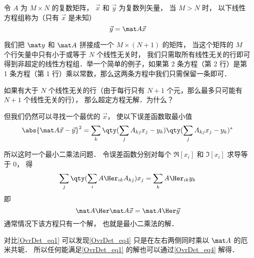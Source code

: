 
令 $A$ 为 $M\times N$ 的复数矩阵， $\vec x$ 和 $\vec y$ 为复数列矢量， 当 $M > N$ 时， 以下线性方程组称为（只有 $\vec x$ 是未知）
\begin{equation}\label{OvrDet_eq1}
\vec y = \mat A \vec x
\end{equation}

我们把 $\mat y$ 和 $\mat A$ 拼接成一个 $M\times(N+1)$ 的矩阵， 当这个矩阵的 $M$ 个行矢量中只有小于或等于 $N$ 个线性无关时， 我们只需取所有线性无关的行即可得到非超定的线性方程组．举一个简单的例子，如果第 2 条方程（第 2 行）是第 1 条方程（第 1 行）乘以常数，那么这两条方程中我们只需保留一条即可．

如果有大于 $N$ 个线性无关的行（由于每行只有 $N+1$ 个元，那么最多只可能有 $N+1$ 个线性无关的行）， 那么超定方程无解．为什么？


但我们仍然可以寻找一个最优的 $\vec x$， 使以下误差函数取最小值
\begin{equation}
\abs{\mat A\vec x - \vec y}^2 =  \sum_k  \qty(\sum_j A_{kj} x_j - y_k) \qty(\sum_j A_{kj} x_j - y_k)^*
\end{equation}

所以这时一个最小二乘法问题． 令误差函数分别对每个 $\Re[x_i]$ 和 $\Im[x_i]$ 求导等于 0， 得
\begin{equation}
\sum_j \qty(\sum_i A\Her_{ik} A_{kj}) x_j = \sum_k A\Her_{ik} y_k
\end{equation}
即
\begin{equation}\label{OvrDet_eq4}
\mat A\Her \mat A \vec x = \mat A\Her \vec y
\end{equation}
通常情况下该方程只有一个解， 也就是最小二乘法的解．

对比\autoref{OvrDet_eq1} 可以发现\autoref{OvrDet_eq4} 只是在左右两侧同时乘以 $\mat A$ 的厄米共轭． 所以任何能满足\autoref{OvrDet_eq1} 的解也可以通过\autoref{OvrDet_eq4} 解得．
